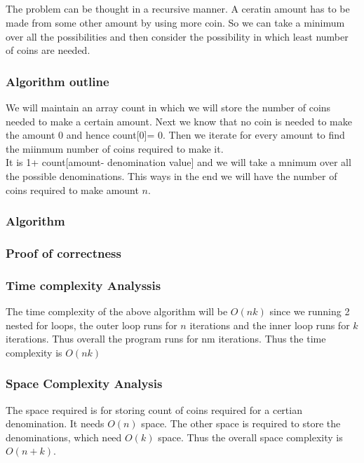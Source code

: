 \documentclass{article}
\begin{document}
\subsection{}
The problem can be thought in a recursive manner. A ceratin amount has to be made from some other amount by using more coin. So we can take a minimum over all the possibilities and then consider the possibility in which least number of coins are needed.  

\subsubsection{Algorithm outline}
We will maintain an array count in which we will store the number of coins needed to make a certain amount. Next we know that no coin is needed to make the amount 0 and hence count[0]= 0. Then we iterate for every amount to find the miinmum number of coins required to make it. \\It is 1+ count[amount- denomination value] and we will take a mnimum over all the possible denominations. This ways in the end we will have the number of coins required to make amount $n$.

\subsubsection{Algorithm}


\subsubsection{Proof of correctness}
\subsubsection{Time complexity Analyssis}
The time complexity of the above algorithm will be $O(nk)$ since we running 2 nested for loops, the outer loop runs for $n$ iterations and the inner loop runs for $k$  iterations. Thus overall the program runs for nm iterations. Thus the time complexity is $O(nk)$
\subsubsection{Space Complexity Analysis}
The space required is for storing count of coins required for a certian denomination. It needs $O(n)$ space. The other space is required to store the denominations, which need $O(k)$ space. Thus the overall space complexity is $O(n+k)$.
\end{document}
